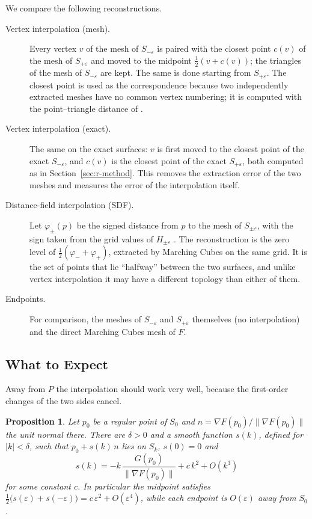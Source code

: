 \documentclass[12pt, a4paper, oneside]{book}
\theoremstyle{plain}
\newtheorem{proposition}[theorem]{Proposition}
\theoremstyle{definition}
\theoremstyle{remark}
\theoremstyle{definition}
\begin{document}
We compare the following reconstructions.
\begin{description}
    \item[Vertex interpolation (mesh).] Every vertex $v$ of the mesh of $S_{-\varepsilon}$ is paired with the closest point $c(v)$ of the mesh of $S_{+\varepsilon}$ and moved to the midpoint $\tfrac12(v+c(v))$; the triangles of the mesh of $S_{-\varepsilon}$ are kept. The same is done starting from $S_{+\varepsilon}$. The closest point is used as the correspondence because two independently extracted meshes have no common vertex numbering; it is computed with the point--triangle distance of \cite{ericson2004realtime}.
    \item[Vertex interpolation (exact).] The same on the exact surfaces: $v$ is first moved to the closest point of the exact $S_{-\varepsilon}$, and $c(v)$ is the closest point of the exact $S_{+\varepsilon}$, both computed as in Section~\ref{sec:r-method}. This removes the extraction error of the two meshes and measures the error of the interpolation itself.
    \item[Distance-field interpolation (SDF).] Let $\varphi_\pm(p)$ be the signed distance from $p$ to the mesh of $S_{\pm\varepsilon}$, with the sign taken from the grid values of $H_{\pm\varepsilon}$ \cite{jones2006distance}. The reconstruction is the zero level of $\tfrac12(\varphi_-+\varphi_+)$, extracted by Marching Cubes on the same grid. It is the set of points that lie ``halfway'' between the two surfaces, and unlike vertex interpolation it may have a different topology than either of them.
    \item[Endpoints.] For comparison, the meshes of $S_{-\varepsilon}$ and $S_{+\varepsilon}$ themselves (no interpolation) and the direct Marching Cubes mesh of $F$.
\end{description}

\subsection{What to Expect}
\label{sec:r-interp-theory}

Away from $P$ the interpolation should work very well, because the first-order changes of the two sides cancel.

\begin{proposition}
\label{prop:second-order}
Let $p_0$ be a regular point of $S_0$ and $n=\nabla F(p_0)/\|\nabla F(p_0)\|$ the unit normal there. There are $\delta>0$ and a smooth function $s(k)$, defined for $|k|<\delta$, such that $p_0+s(k)\,n$ lies on $S_k$, $s(0)=0$ and
\[
s(k)=-k\,\frac{G(p_0)}{\|\nabla F(p_0)\|}+c\,k^2+O(k^3)
\]
for some constant $c$. In particular the midpoint satisfies $\tfrac12\big(s(\varepsilon)+s(-\varepsilon)\big)=c\,\varepsilon^2+O(\varepsilon^4)$, while each endpoint is $O(\varepsilon)$ away from $S_0$.
\end{proposition}
\end{document}
